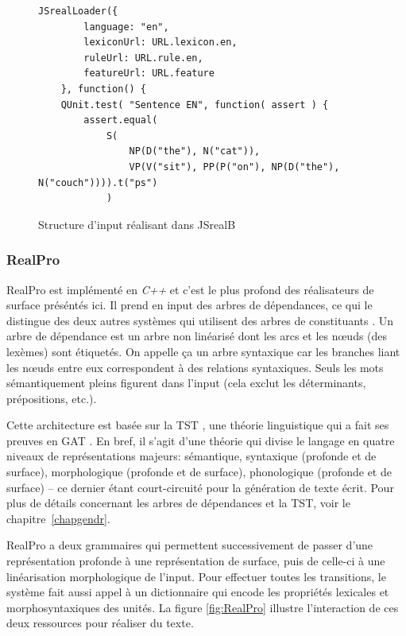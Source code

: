 \begin{figure}[htb]

\begin{lstlisting}[language=mate]
JSrealLoader({
        language: "en",
        lexiconUrl: URL.lexicon.en,
        ruleUrl: URL.rule.en,
        featureUrl: URL.feature
    }, function() {
    QUnit.test( "Sentence EN", function( assert ) {
        assert.equal(
            S(
                NP(D("the"), N("cat")),
                VP(V("sit"), PP(P("on"), NP(D("the"), N("couch")))).t("ps")
            )
\end{lstlisting}
\caption{Structure d'input réalisant  dans JSrealB}
\label{jsreal}
\end{figure}
		
\subsubsection{RealPro}
RealPro \citep{LavoieFastPortableRealizer1997} est implémenté en \emph{C++} et c'est le plus profond des réalisateurs de surface préséntés ici. Il prend en input des arbres de dépendances, ce qui le distingue des deux autres systèmes qui utilisent des arbres de constituants \citep{DBLP:conf/enlg/MolinsL15,GattSimpleNLGRealisationEngine2009}. Un arbre de dépendance est un arbre non linéarisé dont les arcs et les n\oe{}uds (des lexèmes) sont étiquetés. On appelle ça un arbre syntaxique car les branches liant les n\oe{}uds entre eux correspondent à des relations syntaxiques. Seuls les mots sémantiquement pleins figurent dans l'input (cela exclut les déterminants, prépositions, etc.).

Cette architecture est basée sur la \ac{TST} \citep{melcuk1988}, une théorie linguistique qui a fait ses preuves en \ac{GAT} \citep{iordanskaja88,LavoieFastPortableRealizer1997,WannerMARQUISGENERATIONUSERTAILORED2010,MilledemoFORGePompeu2017,Vicentegeneracionlenguajenatural2015}. En bref, il s'agit d'une théorie qui divise le langage en quatre niveaux de représentations majeurs: sémantique, syntaxique (profonde et de surface), morphologique (profonde et de surface), phonologique (profonde et de surface) -- ce dernier étant court-circuité pour la génération de texte écrit. Pour plus de détails concernant les arbres de dépendances et la \ac{TST}, voir le chapitre~\ref{chapgendr}.

RealPro \citep{LavoieFastPortableRealizer1997} a deux grammaires qui permettent successivement de passer d'une représentation profonde à une représentation de surface, puis de celle-ci à une linéarisation morphologique de l'input. Pour effectuer toutes les transitions, le système fait aussi appel à un dictionnaire qui encode les propriétés lexicales et morphosyntaxiques des unités. La figure \ref{fig:RealPro} illustre l'interaction de ces deux ressources pour réaliser du texte.

